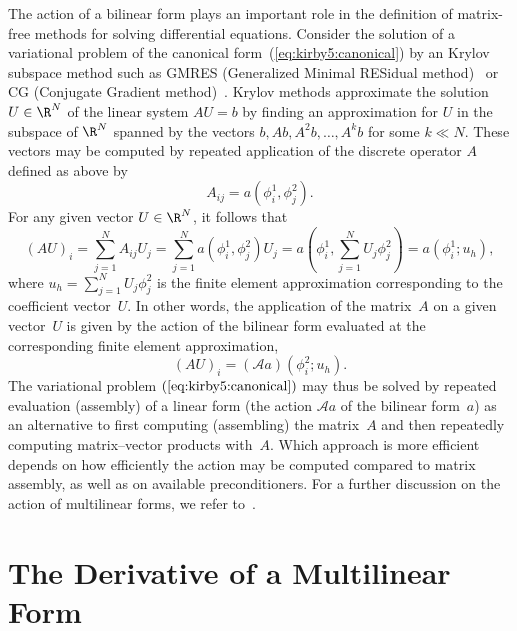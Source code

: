 The action of a bilinear form plays an important role in the
definition of matrix-free methods for solving differential
equations. Consider the solution of a variational problem of the
canonical form~(\ref{eq:kirby5:canonical}) by an Krylov subspace
method such as GMRES (Generalized Minimal RESidual
method)~\cite{SaadSchultz1986} or CG (Conjugate Gradient
method)~\cite{HestenesStiefel1952}. Krylov methods approximate the
solution $U\in\R^N$ of the linear system $AU=b$ by finding an
approximation for $U$ in the subspace of $\R^N$ spanned by the vectors
$b, Ab, A^2b, \ldots, A^kb$ for some $k \ll N$. These vectors may be
computed by repeated application of the discrete operator $A$ defined
as above by
\begin{displaymath}
  A_{ij} = a(\phi^1_i, \phi^2_j).
\end{displaymath}
For any given vector $U \in \R^N$, it follows that
\begin{displaymath}
  (A U)_i = \sum_{j=1}^N A_{ij} U_j
  = \sum_{j=1}^N a(\phi^1_i, \phi^2_j) U_j
  = a\left(\phi^1_i, \sum_{j=1}^N U_j \phi^2_j\right)
  = a(\phi^1_i; u_h),
\end{displaymath}
where $u_h = \sum_{j=1}^N U_j \phi^2_j$ is the finite element
approximation corresponding to the coefficient vector~$U$.
In other words, the application of the matrix~$A$ on a given
vector~$U$ is given by the action of the bilinear form evaluated
at the corresponding finite element approximation,
\begin{displaymath}
  (A U)_i = (\mathcal{A} a) (\phi^2_i; u_h).
\end{displaymath}
The variational problem $(\ref{eq:kirby5:canonical})$ may thus be
solved by repeated evaluation (assembly) of a linear form (the action
$\mathcal{A} a$ of the bilinear form~$a$) as an alternative to first
computing (assembling) the matrix~$A$ and then repeatedly computing
matrix--vector products with~$A$. Which approach is more efficient
depends on how efficiently the action may be computed compared to
matrix assembly, as well as on available preconditioners. For a
further discussion on the action of multilinear forms, we refer
to~\cite{BagheriScott2004}.

\section{The Derivative of a Multilinear Form}

